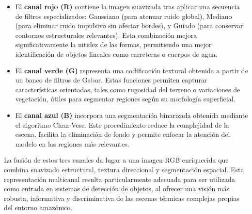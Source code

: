 \begin{itemize}
    \item El \textbf{canal rojo (R)} contiene la imagen suavizada tras aplicar una secuencia de filtros especializados: Gaussiano (para atenuar ruido global), Mediano (para eliminar ruido impulsivo sin afectar bordes), y Guiado (para conservar contornos estructurales relevantes). Esta combinación mejora significativamente la nitidez de las formas, permitiendo una mejor identificación de objetos lineales como carreteras o cuerpos de agua.
    
    \item El \textbf{canal verde (G)} representa una codificación textural obtenida a partir de un banco de filtros de Gabor. Estas funciones permiten capturar características orientadas, tales como rugosidad del terreno o variaciones de vegetación, útiles para segmentar regiones según su morfología superficial.
    
    \item El \textbf{canal azul (B)} incorpora una segmentación binarizada obtenida mediante el algoritmo Chan-Vese. Este procedimiento reduce la complejidad de la escena, facilita la eliminación de fondo y permite enfocar la atención del modelo en las regiones más relevantes.
\end{itemize}

La fusión de estos tres canales da lugar a una imagen RGB enriquecida que combina suavizado estructural, textura direccional y segmentación espacial. Esta representación multicanal resulta particularmente adecuada para ser utilizada como entrada en sistemas de detección de objetos, al ofrecer una visión más robusta, informativa y discriminativa de las escenas térmicas complejas propias del entorno amazónico.

